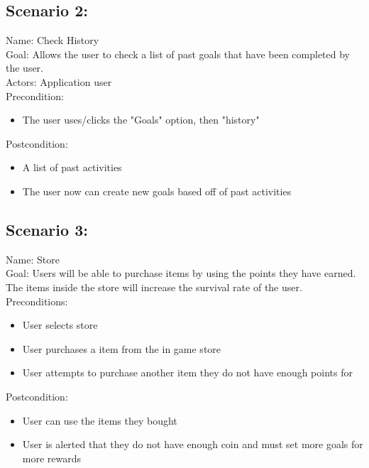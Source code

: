 \documentclass[a4paper]{article}
\begin{document}
\subsection{Scenario 2:}
Name: Check History\newline
\\
Goal: Allows the user to check a list of past goals that have been completed by the user.\newline
\\
Actors: Application user\newline
\\
Precondition: 
\begin{itemize}
\item The user uses/clicks the "Goals" option, then "history"
\end{itemize}
Postcondition: 
\begin{itemize}
\item A list of past activities
\item The user now can create new goals based off of past activities
\end{itemize}



\subsection{Scenario 3:}
Name: Store \newline
\\
Goal: Users will be able to purchase items by using the points they have earned. The items inside the store will increase the survival rate of the user.\newline
\\
Preconditions:
\begin{itemize}
\item User selects store
\item User purchases a item from the in game store
\item User attempts to purchase another item they do not have enough points for
\end{itemize}
Postcondition:
\begin{itemize}
\item User can use the items they bought
\item User is alerted that they do not have enough coin and must set more goals for more rewards
\end{itemize}
\end{document}
